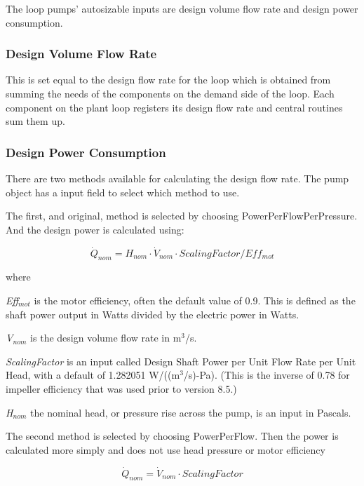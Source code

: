 The loop pumps' autosizable inputs are design volume flow rate and design power consumption.

\subsubsection{Design Volume Flow Rate}\label{design-volume-flow-rate}

This is set equal to the design flow rate for the loop which is obtained from summing the needs of the components on the demand side of the loop. Each component on the plant loop registers its design flow rate and central routines sum them up.

\subsubsection{Design Power Consumption}\label{design-power-consumption}

There are two methods available for calculating the design flow rate. The pump object has a input field to select which method to use.

The first, and original, method is selected by choosing PowerPerFlowPerPressure. And the design power is calculated using:

\begin{equation}
\dot Q_{nom} = H_{nom} \cdot \dot V_{nom} \cdot ScalingFactor /Eff_{mot}
\end{equation}

where

\emph{Eff\(_{mot}\)} is the motor efficiency, often the default value of 0.9. This is defined as the shaft power output in Watts divided by the electric power in Watts.

\emph{V\(_{nom}\)} is the design volume flow rate in m\(^{3}\)/s.

\emph{ScalingFactor} is an input called Design Shaft Power per Unit Flow Rate per Unit Head, with a default of 1.282051 W/((m\(^{3}\)/s)-Pa). (This is the inverse of 0.78 for impeller efficiency that was used prior to version 8.5.)

\emph{H\(_{nom}\)} the nominal head, or pressure rise across the pump, is an input in Pascals.

The second method is selected by choosing PowerPerFlow. Then the power is calculated more simply and does not use head pressure or motor efficiency

\begin{equation}
\dot Q_{nom} = \dot V_{nom} \cdot ScalingFactor
\end{equation}

